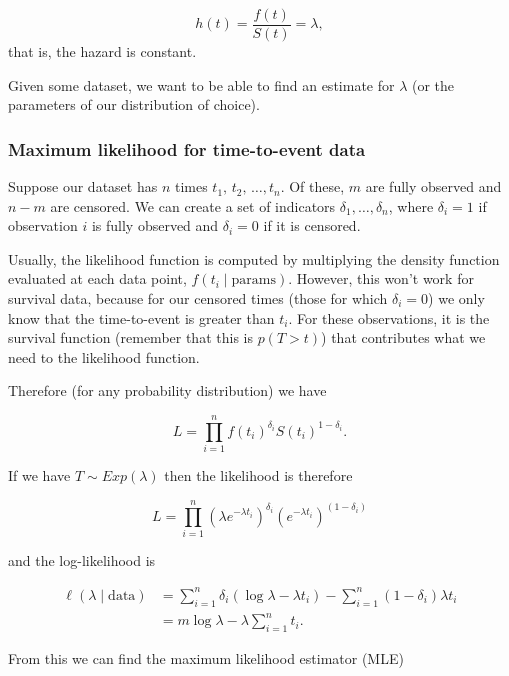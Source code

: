 \documentclass[
  openany]{book}
\theoremstyle{definition}
\theoremstyle{definition}
\theoremstyle{definition}
\theoremstyle{definition}
\theoremstyle{remark}
\begin{document}
\[h\left(t\right) = \frac{f\left(t\right)}{S\left(t\right)} = \lambda, \]
that is, the hazard is constant.

Given some dataset, we want to be able to find an estimate for \(\lambda\) (or the parameters of our distribution of choice).

\subsubsection{Maximum likelihood for time-to-event data}\label{expll}

Suppose our dataset has \(n\) times \(t_1,\,t_2,\,\ldots,t_n\). Of these, \(m\) are fully observed and \(n-m\) are censored. We can create a set of indicators \(\delta_1,\ldots,\delta_n\), where \(\delta_i=1\) if observation \(i\) is fully observed and \(\delta_i=0\) if it is censored.

Usually, the likelihood function is computed by multiplying the density function evaluated at each data point, \(f\left(t_i\mid{\text{params}}\right)\). However, this won't work for survival data, because for our censored times (those for which \(\delta_i=0\)) we only know that the time-to-event is greater than \(t_i\). For these observations, it is the survival function (remember that this is \(p\left(T>t\right)\)) that contributes what we need to the likelihood function.

Therefore (for any probability distribution) we have

\begin{equation}
L = \prod\limits_{i=1}^n f\left(t_i\right)^{\delta_i} S\left(t_i\right)^{1-\delta_i}.
\label{eq:lfunsurv}
\end{equation}

If we have \(T\sim Exp\left(\lambda\right)\) then the likelihood is therefore

\[L = \prod\limits_{i=1}^n \left(\lambda e^{-\lambda t_i}\right)^{\delta_i} \left(e^{-\lambda t_i}\right)^{\left(1-\delta_i\right)} \]

and the log-likelihood is

\begin{align*}
\ell\left(\lambda \mid \text{data}\right) &= \sum\limits_{i=1}^n \delta_i\left(\log\lambda - \lambda t_i\right) - \sum\limits_{i=1}^n\left(1-\delta_i\right)\lambda t_i \\
& =  m\log\lambda - \lambda\sum\limits_{i=1}^n t_i. 
\end{align*}

From this we can find the maximum likelihood estimator (MLE)
\end{document}
